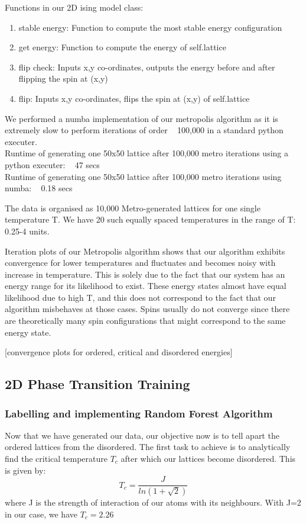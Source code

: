Functions in our 2D ising model class:
\begin{enumerate}

    \item stable energy: Function to compute the most stable energy configuration
    \item get energy: Function to compute the energy of self.lattice
    \item flip check: Inputs x,y co-ordinates, outputs the energy before and after flipping the spin at (x,y)
    \item flip: Inputs x,y co-ordinates, flips the spin at (x,y) of self.lattice

\end{enumerate}

We performed a numba implementation of our metropolis algorithm as it is extremely slow to perform iterations of order ~ 100,000 in a standard python executer. \\
Runtime of generating one 50x50 lattice after 100,000 metro iterations using a python executer: ~ 47 secs\\
Runtime of generating one 50x50 lattice after 100,000 metro iterations using numba: ~ 0.18 secs

The data is organised as 10,000 Metro-generated lattices for one single temperature T. We have 20 such equally spaced temperatures in the range of T: 0.25-4 units.

Iteration plots of our Metropolis algorithm shows that our algorithm exhibits convergence for lower temperatures and fluctuates and becomes noisy with increase in temperature. This is solely due to the fact that our system has an energy range for its likelihood to exist. These energy states almost have equal likelihood due to high T, and this does not correspond to the fact that our algorithm misbehaves at those cases. Spins usually do not converge since there are theoretically many spin configurations that might correspond to the same energy state.

[convergence plots for ordered, critical and disordered energies]

\subsection{2D Phase Transition Training}
\subsubsection{Labelling and implementing Random Forest Algorithm}
Now that we have generated our data, our objective now is to tell apart the ordered lattices from the disordered. The first task to achieve is to analytically find the critical temperature $T_c$ after which our lattices become disordered. This is given by\cite{onsagar}:
\[T_c=\frac{J}{ln(1+\sqrt{2})}\]
where J is the strength of interaction of our atoms with its neighbours. With J=2 in our case, we have $T_c=2.26$

